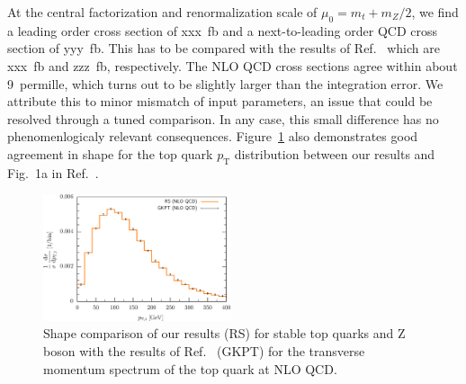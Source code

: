 \documentclass[preprint]{JHEP3} %
\begin{document}
At the central factorization and renormalization scale of $\mu_0=m_t+m_Z/2$, 
we find a leading order cross section of xxx~fb and a next-to-leading order QCD cross section of yyy~fb. 
This has to be compared with the results of Ref.~\cite{Garzelli:2012bn} which are xxx~fb and zzz~fb, respectively.
The NLO QCD cross sections agree within about 9~permille, which turns out to be slightly larger than the integration error.
We attribute this to minor mismatch of input parameters, an issue that could be resolved through a tuned comparison.  
In any case, this small difference has no phenomenlogicaly relevant consequences.
Figure~\ref{fig:i} also demonstrates good agreement in shape for the top quark $p_{\mathrm{T}}$ distribution between our results and Fig.~1a in Ref.~\cite{Garzelli:2012bn}.
\begin{figure}[t]
\centering %
\includegraphics[width=0.49\textwidth]{./Troc_pTtop.eps}
\caption{\label{fig:i} Shape comparison of our results (RS) for stable top quarks and Z boson with the results of Ref.~\cite{Garzelli:2012bn} (GKPT) for 
the transverse momentum spectrum of the top quark at NLO QCD. 
}
\end{figure}
\end{document}
